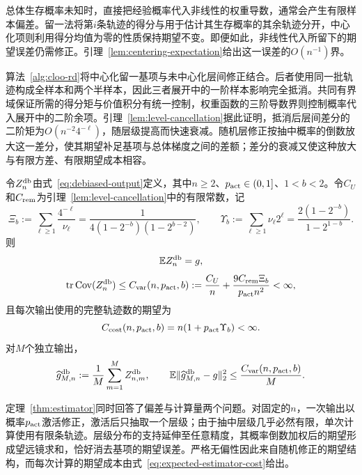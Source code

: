 总体生存概率未知时，直接把经验概率代入非线性的权重导数，通常会产生有限样本偏差。留一法将第$i$条轨迹的得分与用于估计其生存概率的其余轨迹分开，中心化项则利用得分均值为零的性质保持期望不变。即便如此，非线性代入所留下的期望误差仍需修正。引理~\ref{lem:centering-expectation}给出这一误差的$O(n^{-1})$界。

算法~\ref{alg:cloo-rd}将中心化留一基项与未中心化层间修正结合。后者使用同一批轨迹构成全样本和两个半样本，因此三者展开中的一阶样本影响完全抵消。共同有界域保证所需的得分矩与价值积分有统一控制，权重函数的三阶导数界则控制概率代入展开中的二阶余项。引理~\ref{lem:level-cancellation}据此证明，抵消后层间差分的二阶矩为$O(n^{-2}4^{-\ell})$，随层级提高而快速衰减。随机层修正按抽中概率的倒数放大这一差分，使其期望补足基项与总体梯度之间的差额；差分的衰减又使这种放大与有限方差、有限期望成本相容。

\begin{theorem}\label{thm:estimator}
令$Z_n^{\mathrm{db}}$由式~\eqref{eq:debiased-output}定义，其中$n\ge2$、$p_{\rm act}\in(0,1]$、$1<b<2$。令$C_U$和$C_{\rm rem}$为引理~\ref{lem:level-cancellation}中的有限常数，记
\begin{equation}\label{eq:level-series-constants}
 \Xi_b
 :=\sum_{\ell\ge1}\frac{4^{-\ell}}{\nu_\ell}
 =\frac{1}{4(1-2^{-b})(1-2^{b-2})},
 \qquad
 \Upsilon_b
 :=\sum_{\ell\ge1}\nu_\ell2^\ell
 =\frac{2(1-2^{-b})}{1-2^{1-b}}.
\end{equation}
则
\begin{equation}\label{eq:estimator-unbiased}
 \mathbb E Z_n^{\mathrm{db}}=g,
\end{equation}
\begin{equation}\label{eq:single-output-variance}
 \operatorname{tr}\operatorname{Cov}(Z_n^{\mathrm{db}})
 \le C_{\rm var}(n,p_{\rm act},b)
 :=\frac{C_U}{n}+\frac{9C_{\rm rem}\Xi_b}{p_{\rm act} n^2}<\infty,
\end{equation}
且每次输出使用的完整轨迹数的期望为
\begin{equation}\label{eq:expected-estimator-cost}
 C_{\rm cost}(n,p_{\rm act},b)
 =n(1+p_{\rm act}\Upsilon_b)<\infty.
\end{equation}
对$M$个独立输出，
\begin{equation}\label{eq:estimator-mse}
 \widehat g_{M,n}^{\mathrm{db}}:=\frac1M\sum_{m=1}^{M}Z_{n,m}^{\mathrm{db}},
 \qquad
 \mathbb E\lVert\widehat g_{M,n}^{\mathrm{db}}-g\rVert_2^2
 \le\frac{C_{\rm var}(n,p_{\rm act},b)}{M}.
\end{equation}
\end{theorem}

定理~\ref{thm:estimator}同时回答了偏差与计算量两个问题。对固定的$n$，一次输出以概率$p_{\rm act}$激活修正，激活后只抽取一个层级；由于抽中层级几乎必然有限，单次计算使用有限条轨迹。层级分布的支持延伸至任意精度，其概率倒数加权后的期望形成望远镜求和，恰好消去基项的期望误差。严格无偏性因此来自随机修正的期望结构，而每次计算的期望成本由式~\eqref{eq:expected-estimator-cost}给出。

